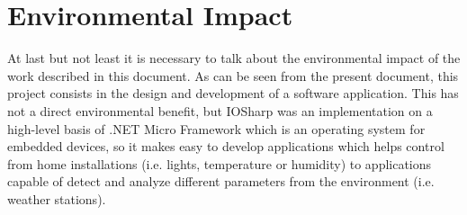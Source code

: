 \section{Environmental Impact}\label{S:Environmental-Impact}
At last but not least it is necessary to talk about the environmental impact of the work
described in this document. As can be seen from the present document, this project
consists in the design and development of a software application. This has not a direct
environmental benefit, but IOSharp was an implementation on a high-level basis of .NET Micro Framework which is an operating system for embedded devices, so it makes easy to develop applications which helps control from home installations (i.e. lights, temperature or humidity) to applications capable of detect and analyze different parameters from the environment (i.e. weather stations).
